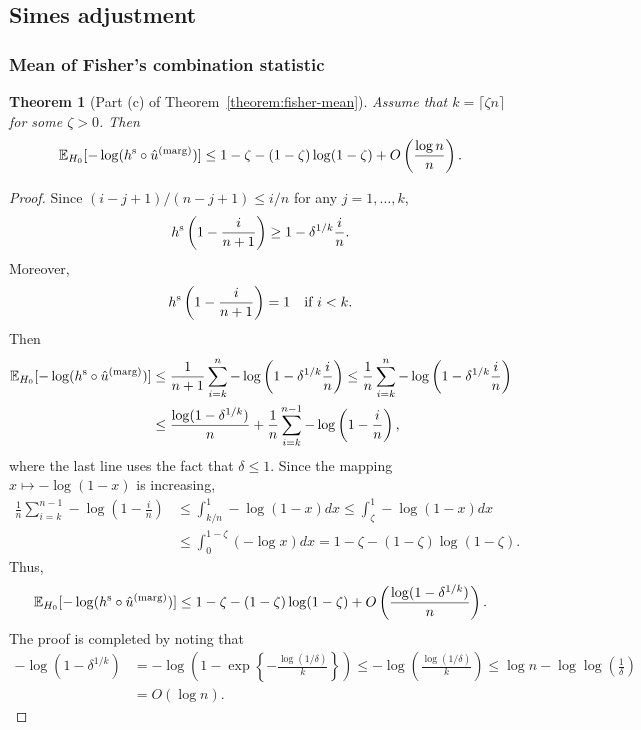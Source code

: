 \documentclass[11pt]{article}
\newtheorem{thm}{Theorem}
\def\E{\mathbb{E}}
\def\marg{\textnormal{(marg)}}
\def\simes{\textnormal{s}}
\newcommand{\lb}{\left(}
\newcommand{\rb}{\right)}
\begin{document}
\subsection{Simes adjustment}
\subsubsection{Mean of Fisher's combination statistic}
\begin{thm}[Part (c) of Theorem~\ref{theorem:fisher-mean}]\label{thm:fisher_simes}
  Assume that $k = \lceil\zeta n\rceil$ for some $\zeta > 0$. Then
  \[\E_{H_0}[-\log (h^\simes \circ \hat{u}^\marg)] \le 1 - \zeta - (1 - \zeta)\log (1 - \zeta) + O\lb\frac{\log n}{n}\rb.\]
\end{thm}
\begin{proof}
  Since $(i - j + 1) / (n - j + 1)\le i / n$ for any $j = 1, \ldots, k$, 
  \[h^\simes\lb 1 - \frac{i}{n+1}\rb\ge 1 - \delta^{1/k}\frac{i}{n}.\]
  Moreover,
  \[h^\simes\lb 1 - \frac{i}{n+1}\rb = 1\quad \text{if }i < k.\]
  Then
  \begin{align*}
    \E_{H_0}[-\log (h^\simes \circ \hat{u}^\marg)]
    &\le \frac{1}{n+1}\sum_{i=k}^{n}-\log\lb 1 - \delta^{1/k}\frac{i}{n}\rb\le \frac{1}{n}\sum_{i=k}^{n}-\log\lb 1 - \delta^{1/k}\frac{i}{n}\rb\\
    & \le \frac{\log (1-\delta^{1/k})}{n} + \frac{1}{n}\sum_{i=k}^{n-1}-\log\lb 1 - \frac{i}{n}\rb,
  \end{align*}
  where the last line uses the fact that $\delta \le 1$. Since the mapping $x\mapsto -\log(1 - x)$ is increasing,
  \begin{align*}
    \frac{1}{n}\sum_{i=k}^{n-1}-\log\lb 1 - \frac{i}{n}\rb &\le \int_{k/n}^{1}-\log(1 - x)dx \le \int_{\zeta}^{1}-\log(1 - x)dx\\
                                                           & \le \int_{0}^{1 - \zeta}(-\log x)dx = 1 - \zeta - (1 - \zeta)\log (1 - \zeta).
  \end{align*}
  Thus,
  \[\E_{H_0}[-\log (h^\simes \circ \hat{u}^\marg)]\le 1 - \zeta - (1 - \zeta)\log (1 - \zeta) + O\lb \frac{\log(1 - \delta^{1/k})}{n}\rb.\]
  The proof is completed by noting that
  \begin{align}
    -\log\lb 1 - \delta^{1/k}\rb & = -\log\lb 1 - \exp\left\{-\frac{\log (1 / \delta)}{k}\right\}\rb \le -\log\lb \frac{\log (1 / \delta)}{k}\rb\le \log n - \log\log\lb\frac{1}{\delta}\rb\label{eq:simes_max}\\
    & = O(\log n)\nonumber.
  \end{align}
\end{proof}
\end{document}
